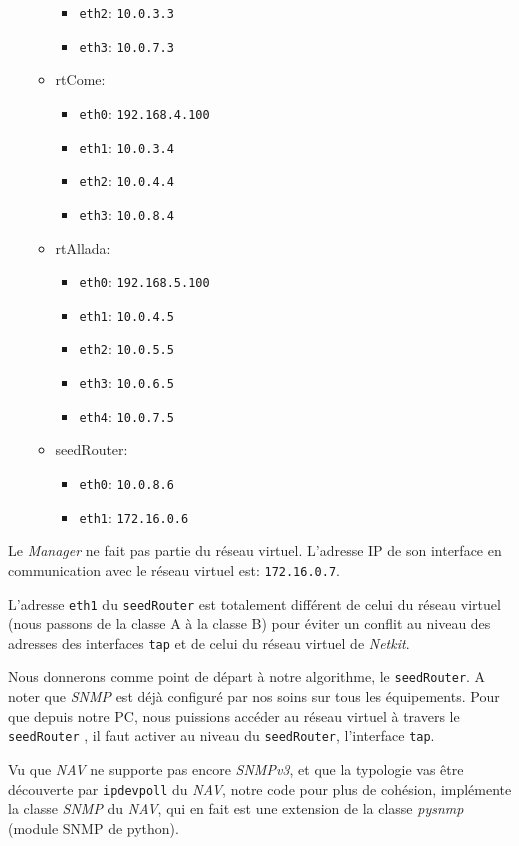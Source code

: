 \begin{itemize}
\begin{itemize}
\begin{itemize}
\item \texttt{eth2}: \texttt{10.0.3.3}
\item \texttt{eth3}: \texttt{10.0.7.3}
\end{itemize}
\item rtCome:
\begin{itemize}
\item \texttt{eth0}: \texttt{192.168.4.100}
\item \texttt{eth1}: \texttt{10.0.3.4}
\item \texttt{eth2}: \texttt{10.0.4.4}
\item \texttt{eth3}: \texttt{10.0.8.4}
\end{itemize}
\item rtAllada:
\begin{itemize}
\item \texttt{eth0}: \texttt{192.168.5.100}
\item \texttt{eth1}: \texttt{10.0.4.5}
\item \texttt{eth2}: \texttt{10.0.5.5}
\item \texttt{eth3}: \texttt{10.0.6.5}
\item \texttt{eth4}: \texttt{10.0.7.5}
\end{itemize}
\item seedRouter: 
\begin{itemize}
\item \texttt{eth0}: \texttt{10.0.8.6}
\item \texttt{eth1}: \texttt{172.16.0.6}
\end{itemize}
\end{itemize}
\end{itemize}
Le \emph{Manager} ne fait pas partie du réseau virtuel. L'adresse IP de son interface en communication avec le réseau virtuel est: \texttt{172.16.0.7}.

L'adresse \texttt{eth1} du \texttt{seedRouter} est totalement différent de celui du réseau virtuel (nous passons de la classe A à la classe B) pour éviter un conflit au niveau des adresses des interfaces \texttt{tap} et de celui du réseau virtuel de \emph{Netkit}.


Nous donnerons comme point de départ à notre algorithme, le \texttt{seedRouter}. A noter que \emph{SNMP} est déjà configuré par nos soins sur tous les équipements. Pour que depuis notre PC, nous puissions accéder au réseau virtuel à travers le \texttt{seedRouter} , il faut activer au  niveau du \texttt{seedRouter}, l'interface \texttt{tap}. 


Vu que \emph{NAV} ne supporte pas encore \emph{SNMPv3}, et que la typologie vas être découverte par \texttt{ipdevpoll} du \emph{NAV}, notre code pour plus de cohésion, implémente la classe \emph{SNMP} du \emph{NAV}, qui en fait est une extension de la classe \emph{pysnmp} (module SNMP de python).



